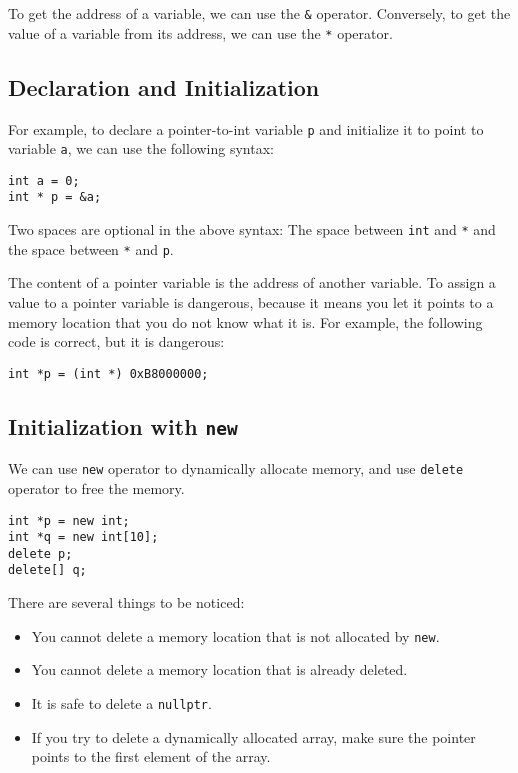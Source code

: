 \documentclass[a4paper,12pt]{article}
\begin{document}
To get the address of a variable, we can use the \texttt{\&} operator.
Conversely, to get the value of a variable from its address, we can use the \texttt{*} operator.

\subsection{Declaration and Initialization}

For example, to declare a pointer-to-int variable \texttt{p} and initialize it to point to variable \texttt{a}, we can use the following syntax:
\begin{verbatim}
int a = 0;
int * p = &a;
\end{verbatim}

Two spaces are optional in the above syntax:
The space between \texttt{int} and \texttt{*} and the space between \texttt{*} and \texttt{p}.

The content of a pointer variable is the address of another variable.
To assign a value to a pointer variable is dangerous, because it means you let it points to a memory location that you do not know what it is.
For example, the following code is correct, but it is dangerous:
\begin{verbatim}
int *p = (int *) 0xB8000000;
\end{verbatim}

\subsection{Initialization with \texttt{new}}

We can use \texttt{new} operator to dynamically allocate memory, and use \texttt{delete} operator to free the memory.
\begin{verbatim}
int *p = new int;
int *q = new int[10];
delete p;
delete[] q;
\end{verbatim}

There are several things to be noticed:
\begin{itemize}
	\item You cannot delete a memory location that is not allocated by \texttt{new}.
	\item You cannot delete a memory location that is already deleted.
	\item It is safe to delete a \texttt{nullptr}.
	\item If you try to delete a dynamically allocated array, make sure the pointer points to the first element of the array.
\end{itemize}
\end{document}
